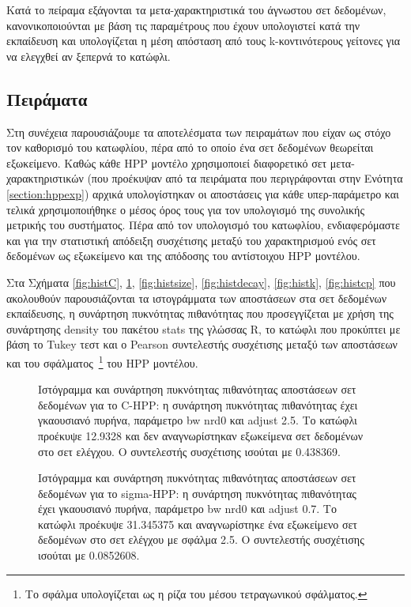 Κατά το πείραμα εξάγονται τα μετα-χαρακτηριστικά του άγνωστου σετ δεδομένων, κανονικοποιούνται  με βάση τις παραμέτρους που έχουν υπολογιστεί κατά την εκπαίδευση και υπολογίζεται η μέση απόσταση από τους k-κοντινότερους γείτονες για να ελεγχθεί αν ξεπερνά το κατώφλι.

\subsection{Πειράματα}
Στη συνέχεια παρουσιάζουμε τα αποτελέσματα των πειραμάτων που είχαν ως στόχο τον καθορισμό του κατωφλίου, πέρα από το οποίο ένα σετ δεδομένων θεωρείται εξωκείμενο. Καθώς κάθε \gls{HPP} μοντέλο χρησιμοποιεί διαφορετικό σετ μετα-χαρακτηριστικών (που προέκυψαν από τα πειράματα που περιγράφονται στην Ενότητα \ref{section:hppexp}) αρχικά υπολογίστηκαν οι αποστάσεις για κάθε υπερ-παράμετρο και τελικά χρησιμοποιήθηκε ο μέσος όρος τους για τον υπολογισμό της συνολικής μετρικής του συστήματος. Πέρα από τον υπολογισμό του κατωφλίου, ενδιαφερόμαστε και για την στατιστική απόδειξη συσχέτισης μεταξύ του χαρακτηρισμού ενός σετ δεδομένων ως εξωκείμενο και της απόδοσης του αντίστοιχου HPP μοντέλου.

Στα Σχήματα \ref{fig:histC}, \ref{fig:histsigma}, \ref{fig:histsize}, \ref{fig:histdecay}, \ref{fig:histk}, \ref{fig:histcp} που ακολουθούν παρουσιάζονται τα ιστογράμματα των αποστάσεων στα σετ δεδομένων εκπαίδευσης, η συνάρτηση πυκνότητας πιθανότητας που προσεγγίζεται με χρήση της συνάρτησης density του πακέτου stats της γλώσσας R, το κατώφλι που προκύπτει με βάση το Tukey τεστ και ο Pearson συντελεστής συσχέτισης μεταξύ των αποστάσεων και του σφάλματος~\footnote{Το σφάλμα υπολογίζεται ως η ρίζα του μέσου τετραγωνικού σφάλματος.} του HPP μοντέλου.


\begin{figure}[!htb]
	\begin{minipage}{0.45\textwidth}
		\centering
		\scalebox{0.35}{
			}
		\caption[Ιστόγραμμα και συνάρτηση πυκνότητας πιθανότητας αποστάσεων σετ δεδομένων για το C-HPP]{Ιστόγραμμα και συνάρτηση πυκνότητας πιθανότητας αποστάσεων σετ δεδομένων για το C-HPP: η συνάρτηση πυκνότητας πιθανότητας έχει γκαουσιανό πυρήνα, παράμετρο bw nrd0 και adjust 2.5. Το κατώφλι προέκυψε 12.9328 και δεν αναγνωρίστηκαν εξωκείμενα σετ δεδομένων στο σετ ελέγχου. Ο συντελεστής συσχέτισης ισούται με 0.438369.}
		\label{fig:histC}
	\end{minipage} \hfill
	\begin{minipage}{0.45\textwidth}
		\centering
		\scalebox{0.35}{
			}
		\caption[Ιστόγραμμα και συνάρτηση πυκνότητας πιθανότητας αποστάσεων σετ δεδομένων για το sigma-HPP]{Ιστόγραμμα και συνάρτηση πυκνότητας πιθανότητας αποστάσεων σετ δεδομένων για το sigma-HPP: η συνάρτηση πυκνότητας πιθανότητας έχει γκαουσιανό πυρήνα, παράμετρο bw nrd0 και adjust 0.7. Το κατώφλι προέκυψε 31.345375 και αναγνωρίστηκε ένα εξωκείμενο σετ δεδομένων στο σετ ελέγχου με σφάλμα 2.5. Ο συντελεστής συσχέτισης ισούται με 0.0852608.}
		\label{fig:histsigma}
	\end{minipage}
\end{figure}

